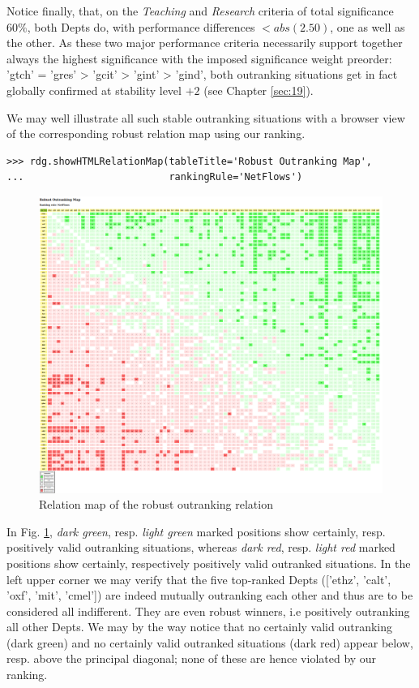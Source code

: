 Notice finally, that, on the \emph{Teaching} and \emph{Research} criteria of total significance $60\%$, both Depts do, with performance differences $< abs(2.50)$, one as well as the other. As these two major performance criteria necessarily support together always the highest significance with the imposed significance weight preorder: 'gtch' = 'gres' > 'gcit' > 'gint' > 'gind', both outranking situations get in fact globally confirmed at stability level $+2$ (see Chapter \ref{sec:19}).

We may well illustrate all such stable outranking situations with a browser view of the corresponding robust relation map using our \NetFlows ranking.

\begin{lstlisting}
>>> rdg.showHTMLRelationMap(tableTitle='Robust Outranking Map',
...                         rankingRule='NetFlows')
\end{lstlisting}

\begin{figure}[h]
\includegraphics[width=12cm]{Figures/the_cs_RelationMap.png}
\caption{Relation map of the robust outranking relation}
\label{fig:13.2}       %
\end{figure}

In Fig. \ref{fig:13.2}, \emph{dark green}, resp. \emph{light green} marked positions show certainly, resp. positively valid outranking situations, whereas \emph{dark red}, resp. \emph{light red} marked positions show certainly, respectively positively valid outranked situations. In the left upper corner we may verify that the five top-ranked Depts (['ethz', 'calt', 'oxf', 'mit', 'cmel']) are indeed mutually outranking each other and thus are to be considered all indifferent. They are even robust \Condorcet winners, i.e positively outranking all other Depts. We may by the way notice that no certainly valid outranking (dark green) and no certainly valid outranked situations (dark red) appear below, resp. above the principal diagonal; none of these are hence violated by our \NetFlows ranking.

